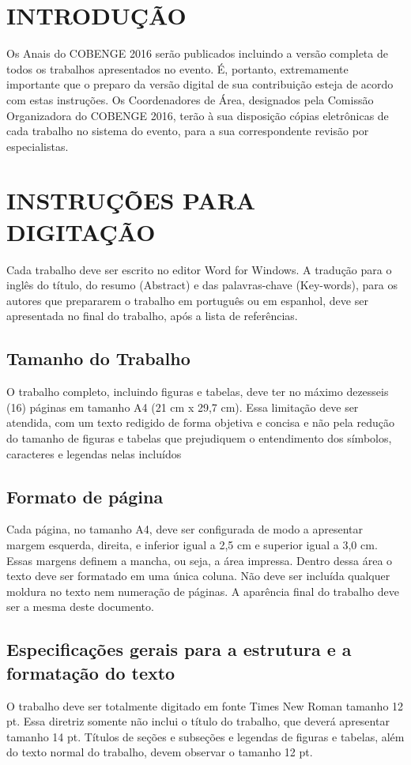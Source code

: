\documentclass[12pt,a4paper]{article}
\begin{document}
\section{INTRODUÇÃO}

Os Anais do COBENGE 2016 serão publicados incluindo a versão completa de todos os trabalhos apresentados no evento. É, portanto, extremamente importante que o preparo da versão digital de sua contribuição esteja de acordo com estas instruções.
Os Coordenadores de Área, designados pela Comissão Organizadora do COBENGE 2016, terão à sua disposição cópias eletrônicas de cada trabalho no sistema do evento, para a sua correspondente revisão por especialistas.

\section{INSTRUÇÕES PARA DIGITAÇÃO}

Cada trabalho deve ser escrito no editor Word for Windows. A tradução para o inglês do título, do resumo (Abstract) e das palavras-chave (Key-words), para os autores que prepararem o trabalho em português ou em espanhol, deve ser apresentada no final do trabalho, após a lista de referências.

\subsection{Tamanho do Trabalho}

O trabalho completo, incluindo figuras e tabelas, deve ter no máximo dezesseis (16) páginas em tamanho A4 (21 cm x 29,7 cm). Essa limitação deve ser atendida, com um texto redigido de forma objetiva e concisa e não pela redução do tamanho de figuras e tabelas que prejudiquem o entendimento dos símbolos, caracteres e legendas nelas incluídos 

\subsection{Formato de página}

Cada página, no tamanho A4, deve ser configurada de modo a apresentar margem esquerda, direita, e inferior igual a 2,5 cm e superior igual a 3,0 cm. Essas margens definem a mancha, ou seja, a área impressa. Dentro dessa área o texto deve ser formatado em uma única coluna. Não deve ser incluída qualquer moldura no texto nem numeração de páginas. A aparência final do trabalho deve ser a mesma deste documento.

\subsection{Especificações gerais para a estrutura e a formatação do texto}
O trabalho deve ser totalmente digitado em fonte Times New Roman tamanho 12 pt. Essa diretriz somente não inclui o título do trabalho, que deverá apresentar tamanho 14 pt. Títulos de seções e subseções e legendas de figuras e tabelas, além do texto normal do trabalho, devem observar o tamanho 12 pt.
\end{document}
